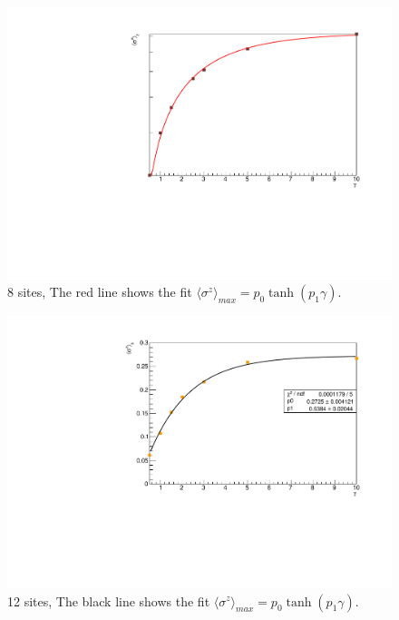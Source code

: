 \begin{figure}[H]
    \centering
    \includegraphics[scale=0.7]{Figures/8sites_comparison/FIT8sites_LM_2ndSiteVSgamma.pdf}
    \caption{8 sites, The red line shows the fit $\langle\sigma^z\rangle_{max} = p_0\tanh{(p_1\gamma)}$.}
    \label{fig:my_label}
\end{figure}

\begin{figure}[H]
    \centering
    \includegraphics[scale=0.7]{Figures/12sites/FIT12sites_3rdSiteVSgamma.pdf}
    \caption{12 sites, The black line shows the fit $\langle\sigma^z\rangle_{max} = p_0\tanh{(p_1\gamma)}$.}
    \label{fig:my_label}
\end{figure}


